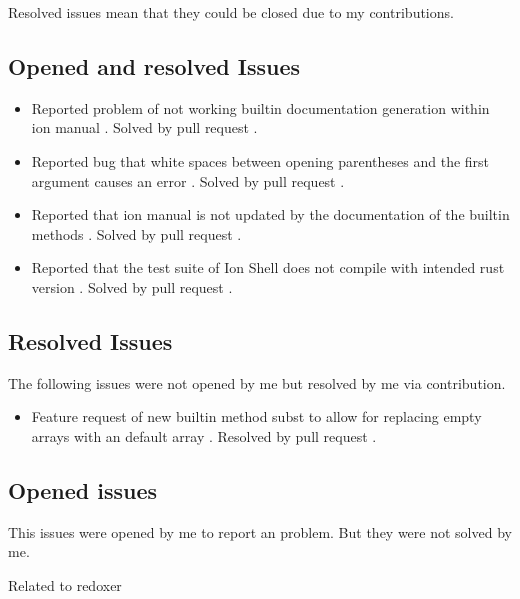 Resolved issues mean that they could be closed due to my contributions.

\subsection{Opened and resolved Issues}

\begin{itemize}
	\item Reported problem of not working builtin documentation generation within ion manual \cite{issue_builtin_generation}. Solved by pull request \cite{pr_man_history_included_ion_manual}.
	\item Reported bug that white spaces between opening parentheses and the first argument causes an error \cite{issue_spaces_between_opening_parentheses}. Solved by pull request \cite{issue_spaces_between_opening_parentheses}.
	\item Reported that ion manual is not updated by the documentation of the builtin methods \cite{issue_ion_manual_not_updated}. Solved by pull request \cite{ion_shell_subst_ion_subst_pr}.
	\item Reported that the test suite of Ion Shell does not compile with intended rust version \cite{issue_bug_test_not_compile}. Solved by pull request \cite{pr_conf_partial_ci_fix}.
\end{itemize}

\subsection{Resolved Issues}

The following issues were not opened by me but resolved by me via contribution.

\begin{itemize}
	\item Feature request of new builtin method subst to allow for replacing empty arrays with an default array \cite{issue_subst_request}. Resolved by pull request \cite{pr_subst_method}.

\end{itemize}

\subsection{Opened issues}

This issues were opened by me to report an problem. But they were not solved by me.

Related to \gls{redoxer}


